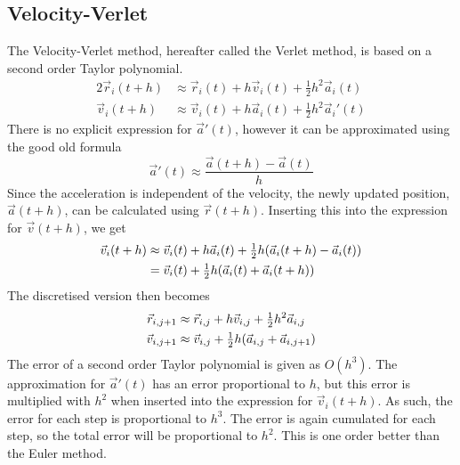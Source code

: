 \documentclass[12pt,english,a4paper]{report}
\begin{document}
\subsection{Velocity-Verlet}
The Velocity-Verlet method, hereafter called the Verlet method, is based on a second order Taylor polynomial.
\begin{alignat*}{2}
\vec{r}_i(t+h) &\approx \vec{r}_i(t) + h\vec{v}_i(t) + \tfrac{1}{2}h^2\vec{a}_i(t)\\
\vec{v}_i(t+h) &\approx \vec{v}_i(t) + h\vec{a}_i(t) + \tfrac{1}{2}h^2\vec{a}_i'(t)
\end{alignat*}
There is no explicit expression for \(\vec{a}'(t)\), however it can be approximated using the good old formula
\[
\vec{a}'(t)\approx\frac{\vec{a}(t+h)-\vec{a}(t)}{h}
\]
Since the acceleration is independent of the velocity, the newly updated position, \(\vec{a}(t+h)\), can be calculated using \(\vec{r}(t+h)\). Inserting this into the expression for \(\vec{v}(t+h)\), we get
\begin{alignat*}{2}
\vec{v}_i(t+h) &\approx \vec{v}_i(t) + h\vec{a}_i(t) + \tfrac{1}{2}h\qty(\vec{a}_i(t+h)-\vec{a}_i(t))\\
&= \vec{v}_i(t) + \tfrac{1}{2}h\qty(\vec{a}_i(t)+\vec{a}_i(t+h))
\end{alignat*}
The discretised version then becomes
\begin{alignat*}{2}
\vec{r}_{i,j+1} &\approx \vec{r}_{i,j} + h\vec{v}_{i,j} + \tfrac{1}{2}h^2\vec{a}_{i,j}\\
\vec{v}_{i,j+1} &\approx \vec{v}_{i,j} + \tfrac{1}{2}h\qty(\vec{a}_{i,j} + \vec{a}_{i,j+1})
\end{alignat*}
The error of a second order Taylor polynomial is given as \(O(h^3)\). The approximation for \(\vec{a}'(t)\) has an error proportional to \(h\), but this error is multiplied with \(h^2\) when inserted into the expression for \(\vec{v}_i(t+h)\). As such, the error for each step is proportional to \(h^3\). The error is again cumulated for each step, so the total error will be proportional to \(h^2\). This is one order better than the Euler method.






\clearpage
{}
\printbibliography
\end{document}
